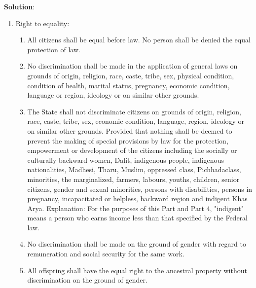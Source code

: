 \documentclass[
]{book}
\newenvironment{solution}{ {\bfseries Solution}:}{}
\begin{document}
\begin{questions}
\begin{solution}
\begin{enumerate}
\item Right to equality:
\begin{enumerate}
\item All citizens shall be equal before law. No person shall be denied the equal protection of law.
\item No discrimination shall be made in the application of general laws on grounds of origin, religion, race, caste, tribe, sex, physical condition, condition of health, marital status, pregnancy, economic condition, language or region, ideology or on similar other grounds.
\item The State shall not discriminate citizens on grounds of origin, religion, race, caste, tribe, sex, economic condition, language, region, ideology or on similar other grounds. Provided that nothing shall be deemed to prevent the making of special provisions by law for the protection, empowerment or development of the citizens including the socially or culturally backward women, Dalit, indigenous people, indigenous nationalities, Madhesi, Tharu, Muslim, oppressed class, Pichhadaclass, minorities, the marginalized, farmers, labours, youths, children, senior citizens, gender and sexual minorities, persons with disabilities, persons in pregnancy, incapacitated or helpless, backward region and indigent Khas Arya.
Explanation: For the purposes of this Part and Part 4, "indigent" means a person who earns income less than that specified by the Federal law.
\item No discrimination shall be made on the ground of gender with regard to remuneration and social security for the same work.
\item All offspring shall have the equal right to the ancestral property without discrimination on the ground of gender.
\end{enumerate}


\end{enumerate}
\end{solution}
\end{questions}
\end{document}
